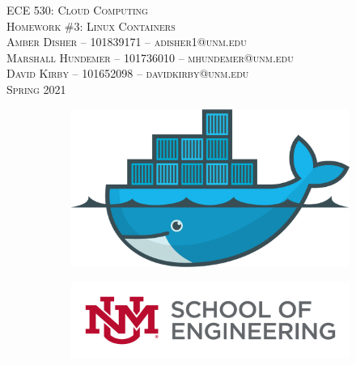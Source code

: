 \documentclass{article}
\begin{document}
\setmainfont{SF Pro Text}
\setsansfont{SF Pro Text}
\setmonofont{SF Mono}
\renewcommand{\familydefault}{\sfdefault}

\thispagestyle{empty}
\begin{titlepage}
\vspace*{\fill}
\begin{center}
\textsc{\Huge{ECE 530: Cloud Computing}}\\[3em]
\textsc{\LARGE Homework \#3: Linux Containers}\\[6em]
\textsc{\Large\hspace{2em} Amber Disher -- 101839171 -- adisher1@unm.edu\\[0.8em]
Marshall Hundemer -- 101736010 -- mhundemer@unm.edu\\[1em]
\hspace{3.5em} David Kirby -- 101652098 -- davidkirby@unm.edu}\\[3em]
\textsc{\Large Spring 2021}
\end{center}
\vfill
\begin{figure}[h]
\begin{subfigure}{0.5\textwidth}
\includegraphics[width=0.5\linewidth]{Docker.png}
\end{subfigure}
\begin{subfigure}{0.6\textwidth}\hspace{1em}
\includegraphics[width=0.8\linewidth]{new-soe-logo.png}
\end{subfigure}
\end{figure}
\end{titlepage}
\setcounter{figure}{0}

\tableofcontents

\listoffigures
\newpage
\setcounter{section}{+1}
\end{document}
